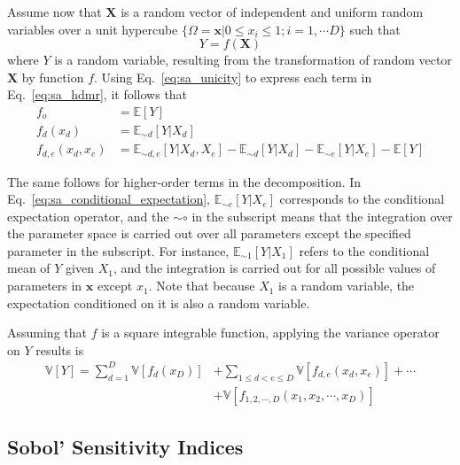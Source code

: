Assume now that $\mathbf{X}$ is a random vector of independent and uniform random variables over a unit hypercube
$\{\Omega = \mathbf{x} | 0 \leq x_i  \leq 1; i = 1,\cdots D\}$ such that
\begin{equation}
	Y = f(\mathbf{X})
\label{eq:sa_random_function}
\end{equation}
where $Y$ is a random variable, resulting from the transformation of random vector $\mathbf{X}$ by function $f$.
Using Eq.~\ref{eq:sa_unicity} to express each term in Eq.~\ref{eq:sa_hdmr}, it follows that
\begin{equation}
	\begin{split}
		f_o & = \mathbb{E}[Y] \\
	  f_d(x_d) & = \mathbb{E}_{\sim d}[Y|X_d] \\
    f_{d,e}(x_d,x_e) & = \mathbb{E}_{\sim d,e} [Y|X_d, X_e] - \mathbb{E}_{\sim d}[Y|X_d] - \mathbb{E}_{\sim e}[Y|X_e] - \mathbb{E}[Y] 
	\end{split}
\label{eq:sa_conditional_expectation}
\end{equation}

The same follows for higher-order terms in the decomposition. 
In Eq.~\ref{eq:sa_conditional_expectation}, $\mathbb{E}_{\sim e} [Y|X_e]$ corresponds to the conditional expectation operator,
and the $\sim\circ$ in the subscript means that the integration over the parameter space is carried out over all parameters except the specified parameter in the subscript.
For instance, $\mathbb{E}_{\sim 1} [Y|X_1]$ refers to the conditional mean of $Y$ given $X_1$, and the integration is carried out for all possible values of parameters in $\mathbf{x}$ except $x_1$.
Note that because $X_1$ is a random variable, the expectation conditioned on it is also a random variable.

Assuming that $f$ is a square integrable function, applying the variance operator on $Y$ results is
\begin{equation}
	\begin{split}
		\mathbb{V}[Y] = \sum_{d=1}^{D} \mathbb{V}[f_d (x_D)] & + \sum_{1 \leq d < e \leq D} \mathbb{V} [f_{d,e} (x_d, x_e)] + \cdots \\
	                                                       & + \mathbb{V} [f_{1,2,\cdots,D} (x_1, x_2, \cdots, x_D)]
		\end{split}
\label{eq:sa_variance_decomposition}
\end{equation}

\subsection{Sobol' Sensitivity Indices}\label{sub:sa_sobol_indices}


